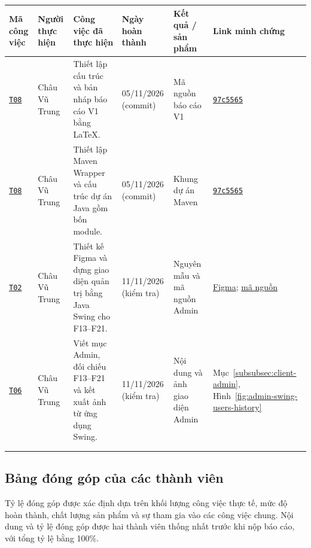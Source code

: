 \begin{center}
\small
\setlength{\tabcolsep}{4pt}
\label{tab:ket-qua-thuc-hien}
\begin{tabularx}{\textwidth}{|C{1.4cm}|L{2.2cm}|Y|L{2.1cm}|L{2.5cm}|L{2cm}|}
  \hline
  \textbf{Mã công việc} & \textbf{Người thực hiện} & \textbf{Công việc đã thực hiện} &
  \textbf{Ngày hoàn thành} & \textbf{Kết quả / sản phẩm} & \textbf{Link minh chứng}\\
  \hline
  \hyperlink{T08}{\texttt{T08}} & Châu Vũ Trung &
    Thiết lập cấu trúc và bản nháp báo cáo V1 bằng LaTeX. &
    05/11/2026 (commit) & Mã nguồn báo cáo V1 &
    \href{https://github.com/nguyenshai/Project-java/commit/97c5565ffd339990c2cdc7d8f282d2d1a080a7d6}{\texttt{97c5565}} \\
  \hline
  \hyperlink{T08}{\texttt{T08}} & Châu Vũ Trung &
    Thiết lập Maven Wrapper và cấu trúc dự án Java gồm bốn module. &
    05/11/2026 (commit) & Khung dự án Maven &
    \href{https://github.com/nguyenshai/Project-java/commit/97c5565ffd339990c2cdc7d8f282d2d1a080a7d6}{\texttt{97c5565}} \\
  \hline
  \hyperlink{T02}{\texttt{T02}} & Châu Vũ Trung &
    Thiết kế Figma và dựng giao diện quản trị bằng Java Swing cho F13--F21. &
    11/11/2026 (kiểm tra) & Nguyên mẫu và mã nguồn Admin &
    \href{https://www.figma.com/design/maCogjZs9eOOhfkxsOZoIU/ChatApp-Admin?node-id=2-80}{Figma};
    \href{https://github.com/nguyenshai/Project-java/tree/trung/src/admin-client}{mã nguồn} \\
  \hline
  \hyperlink{T06}{\texttt{T06}} & Châu Vũ Trung &
    Viết mục Admin, đối chiếu F13--F21 và kết xuất ảnh từ ứng dụng Swing. &
    11/11/2026 (kiểm tra) & Nội dung và ảnh giao diện Admin &
    Mục~\ref{subsubsec:client-admin}, Hình~\ref{fig:admin-swing-users-history} \\
  \hline
  \rule{0pt}{1.15cm} & & & & & \\
  \hline
  \rule{0pt}{1.15cm} & & & & & \\
  \hline
\end{tabularx}
\end{center}

\clearpage
\subsection{Bảng đóng góp của các thành viên}
\label{subsec:dong-gop-thanh-vien}

Tỷ lệ đóng góp được xác định dựa trên khối lượng công việc thực tế, mức độ
hoàn thành, chất lượng sản phẩm và sự tham gia vào các công việc chung.
Nội dung và tỷ lệ đóng góp được hai thành viên thống nhất trước khi nộp
báo cáo, với tổng tỷ lệ bằng 100\%.

